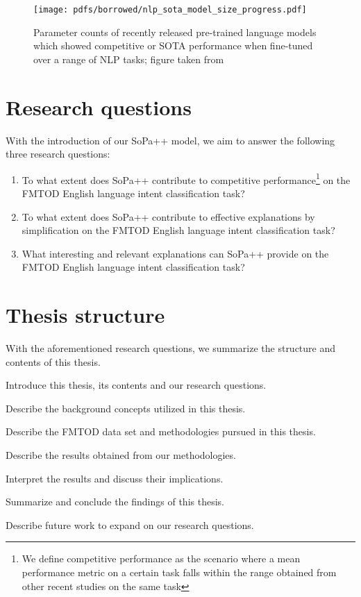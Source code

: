 \begin{figure}[th]
  \centering
  \texttt{[image: pdfs/borrowed/nlp\_sota\_model\_size\_progress.pdf]}
  \caption{Parameter counts of recently released pre-trained language models
    which showed competitive or SOTA performance when fine-tuned over a range of
    NLP tasks; figure taken from \citet{sanh2019distilbert}}
  \label{fig:nlp_progress}
\end{figure}

\section{Research questions}

\label{section:rq}

With the introduction of our SoPa++ model, we aim to answer the following three
research questions:

\begin{enumerate}
  \item To what extent does SoPa++ contribute to competitive
  performance\footnote{We define competitive performance as the scenario where a
    mean performance metric on a certain task falls within the range
    obtained from other recent studies on the same task} on the FMTOD
  English language intent classification task?
  \item To what extent does SoPa++ contribute to effective explanations by
  simplification on the FMTOD English language intent classification task?
  \item What interesting and relevant explanations can SoPa++ provide on the
  FMTOD English language intent classification task?
\end{enumerate}

\section{Thesis structure}

With the aforementioned research questions, we summarize the structure and
contents of this thesis.

\begin{description}[align=left]
  \item [Chapter \ref{chapter:introduction}:] Introduce this thesis, its
  contents and our research questions.
  \item [Chapter \ref{chapter:background}:] Describe the background concepts
  utilized in this thesis.
  \item [Chapter \ref{chapter:methodologies}:] Describe the FMTOD data set and
  methodologies pursued in this thesis.
  \item [Chapter \ref{chapter:results}:] Describe the results obtained from our
  methodologies.
  \item [Chapter \ref{chapter:discussion}:] Interpret the results and discuss their
  implications.
  \item [Chapter \ref{chapter:conclusions}:] Summarize and conclude the findings
  of this thesis.
  \item [Chapter \ref{chapter:further_work}:] Describe future work to expand on
  our research questions.
\end{description}


